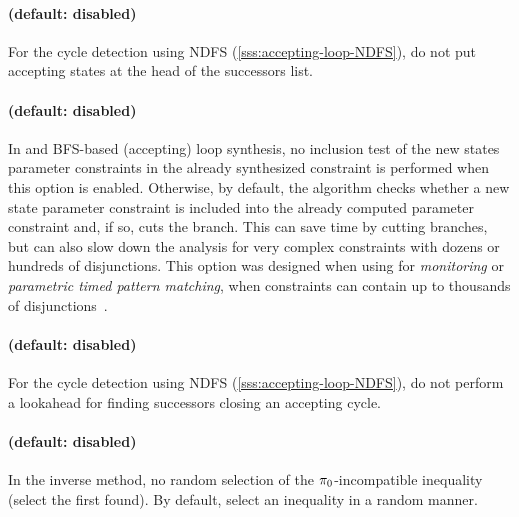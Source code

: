 \paragraph{ (default: disabled)}
For the cycle detection using NDFS (\cref{sss:accepting-loop-NDFS}),
do not put accepting states at the head of the successors list.


\paragraph{ (default: disabled)}
In \EFsynth{} and BFS-based (accepting) loop synthesis, no inclusion test of the new states parameter constraints in the already synthesized constraint is performed when this option is enabled.
Otherwise, by default, the algorithm checks whether a new state parameter constraint is included into the already computed parameter constraint and, if so, cuts the branch.
This can save time by cutting branches, but can also slow down the analysis for very complex constraints with dozens or hundreds of disjunctions.
This option was designed when using \imitator{} for \emph{monitoring} or \emph{parametric timed pattern matching}, when constraints can contain up to thousands of disjunctions~\cite{AHW18}.


\paragraph{ (default: disabled)}
For the cycle detection using NDFS (\cref{sss:accepting-loop-NDFS}),
do not perform a lookahead for finding successors
closing an accepting cycle.


\paragraph{ (default: disabled)}
In the inverse method, no random selection of the $\pi_0$-incompatible inequality (select the first found).
By default, select an inequality in a random manner.



